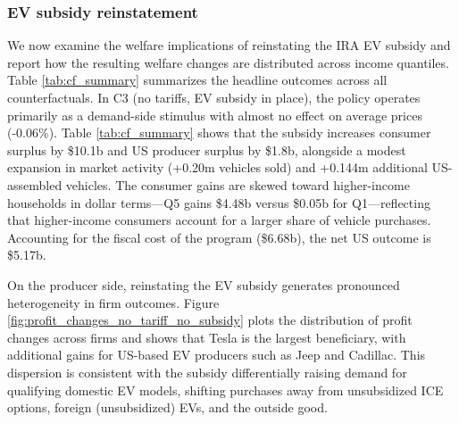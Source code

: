 \documentclass[11pt]{article}
\begin{document}


\subsubsection{EV subsidy reinstatement}
We now examine the welfare implications of reinstating the IRA EV subsidy and report how the resulting welfare changes are distributed across income quantiles. Table \ref{tab:cf_summary} summarizes the headline outcomes across all counterfactuals. %
In C3 (no tariffs, EV subsidy in place), the policy operates primarily as a demand-side stimulus with almost no effect on average prices (-0.06\%). Table \ref{tab:cf_summary} shows that the subsidy increases consumer surplus by \$10.1b and US producer surplus by \$1.8b, alongside a modest expansion in market activity (+0.20m vehicles sold) and +0.144m additional US-assembled vehicles. The consumer gains are skewed toward higher-income households in dollar terms—Q5 gains \$4.48b versus \$0.05b for Q1—reflecting that higher-income consumers account for a larger share of vehicle purchases. Accounting for the fiscal cost of the program (\$6.68b), the net US outcome is \$5.17b.


On the producer side, reinstating the EV subsidy generates pronounced heterogeneity in firm outcomes. Figure \ref{fig:profit_changes_no_tariff_no_subsidy} plots the distribution of profit changes across firms and shows that Tesla is the largest beneficiary, with additional gains for US-based EV producers such as Jeep and Cadillac. This dispersion is consistent with the subsidy differentially raising demand for qualifying domestic EV models, shifting purchases away from unsubsidized ICE options, foreign (unsubsidized) EVs, and the outside good.
\end{document}
